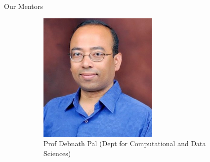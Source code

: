\begin{frame}{Our Mentors}
    \begin{figure}[h]
        \begin{subfigure}[b]{0.3\textwidth}
            \centering
            \includegraphics[width=\textwidth]{images/debnath.png}
            \caption{Prof Debnath Pal (Dept for Computational and Data Sciences)}
            \label{fig:image2}
        \end{subfigure}
        \hfill
        \centering
        \begin{subfigure}[b]{0.3\textwidth}
            \centering

\end{subfigure}
\end{figure}
\end{frame}

